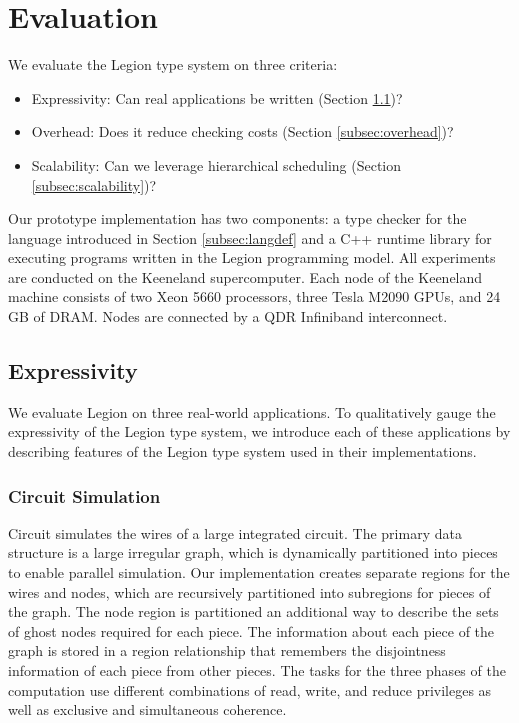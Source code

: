 
\section{Evaluation}
\label{sec:evaluation}

We evaluate the Legion type system on three criteria:
\begin{itemize}
\item Expressivity: Can real applications be written (Section \ref{subsec:expressivity})?
\item Overhead: Does it reduce checking costs (Section \ref{subsec:overhead})?
\item Scalability: Can we leverage hierarchical scheduling (Section \ref{subsec:scalability})?
\end{itemize}
Our prototype implementation has two components: a type checker
for the language introduced in Section \ref{subsec:langdef} and a C++ runtime library
for executing programs written in the Legion programming model\cite{Legion12}.  All experiments
are conducted on the Keeneland supercomputer\cite{Keeneland}.  Each node of the Keeneland
machine consists of two Xeon 5660 processors, three Tesla M2090 GPUs, and 24 GB of DRAM.  Nodes
are connected by a QDR Infiniband interconnect.

\subsection{Expressivity}
\label{subsec:expressivity}
We evaluate Legion on three real-world applications.  To qualitatively gauge the 
expressivity of the Legion type system, we introduce each of these applications
by describing features of the Legion type system used in their implementations.

\subsubsection{Circuit Simulation}
\label{subsec:circuit}
Circuit simulates the wires of a large integrated circuit.
The primary data structure is a large irregular graph, which is
dynamically partitioned into pieces to enable parallel simulation.
Our implementation creates separate regions for the wires and
nodes,  which are recursively partitioned into
subregions for pieces of the graph.  The node region is partitioned an additional way to 
describe the sets of ghost nodes required for each piece.  
The information about each piece of the graph is stored
in a region relationship that remembers the disjointness information of each piece
from other pieces.  The tasks for the three phases of the computation use different combinations of
read, write, and reduce privileges as well as exclusive and simultaneous coherence.

